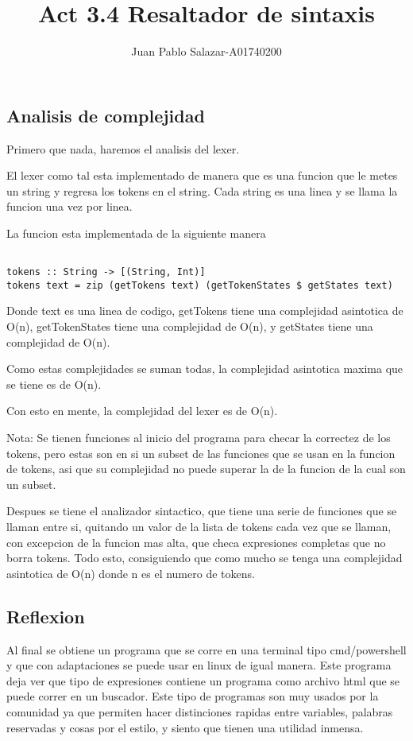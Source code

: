 \documentclass{jhwhw}
\newcommand{\mytitle}{Act 3.4 Resaltador de sintaxis}
\begin{document}
\author{Juan Pablo Salazar-A01740200}
\title{\mytitle}

\maketitle

\subsection*{Analisis de complejidad}

Primero que nada, haremos el analisis del lexer.

\bigskip

El lexer como tal esta implementado de manera que es una funcion que le metes un string y regresa los tokens en el string. Cada string es una linea y se llama la funcion una vez por linea.

La funcion esta implementada de la siguiente manera
\begin{verbatim}
    
tokens :: String -> [(String, Int)]
tokens text = zip (getTokens text) (getTokenStates $ getStates text)
\end{verbatim}

Donde text es una linea de codigo, getTokens tiene una complejidad asintotica de O(n), getTokenStates tiene una complejidad de O(n), y getStates tiene una complejidad de O(n).

Como estas complejidades se suman todas, la complejidad asintotica maxima que se tiene es de O(n).

Con esto en mente, la complejidad del lexer es de O(n).

\bigskip

Nota: Se tienen funciones al inicio del programa para checar la correctez de los tokens, pero estas son en si un subset de las funciones que se usan en la funcion de tokens, asi que su complejidad no puede superar la de la funcion de la cual son un subset.

\bigskip

Despues se tiene el analizador sintactico, que tiene una serie de funciones que se llaman entre si, quitando un valor de la lista de tokens cada vez que se llaman, con excepcion de la funcion mas alta, que checa expresiones completas que no borra tokens. Todo esto, consiguiendo que como mucho se tenga una complejidad asintotica de O(n) donde n es el numero de tokens.

\subsection*{Reflexion}

Al final se obtiene un programa que se corre en una terminal tipo cmd/powershell y que con adaptaciones se puede usar en linux de igual manera. Este programa deja ver que tipo de expresiones contiene un programa como archivo html que se puede correr en un buscador. Este tipo de programas son muy usados por la comunidad ya que permiten hacer distinciones rapidas entre variables, palabras reservadas y cosas por el estilo, y siento que tienen una utilidad inmensa.
\end{document}
